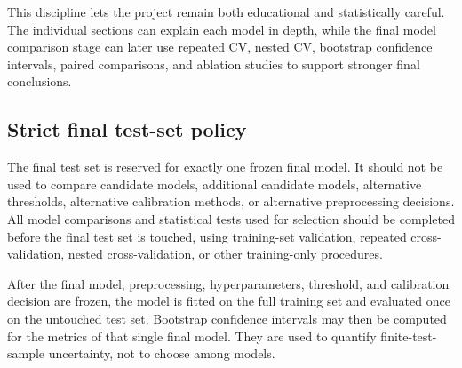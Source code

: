 This discipline lets the project remain both educational and statistically careful. The individual sections can explain each model in depth, while the final model comparison stage can later use repeated CV, nested CV, bootstrap confidence intervals, paired comparisons, and ablation studies to support stronger final conclusions.


\subsection{Strict final test-set policy}

The final test set is reserved for exactly one frozen final model. It should not be used to compare candidate models, additional candidate models, alternative thresholds, alternative calibration methods, or alternative preprocessing decisions. All model comparisons and statistical tests used for selection should be completed before the final test set is touched, using training-set validation, repeated cross-validation, nested cross-validation, or other training-only procedures.

After the final model, preprocessing, hyperparameters, threshold, and calibration decision are frozen, the model is fitted on the full training set and evaluated once on the untouched test set. Bootstrap confidence intervals may then be computed for the metrics of that single final model. They are used to quantify finite-test-sample uncertainty, not to choose among models.
